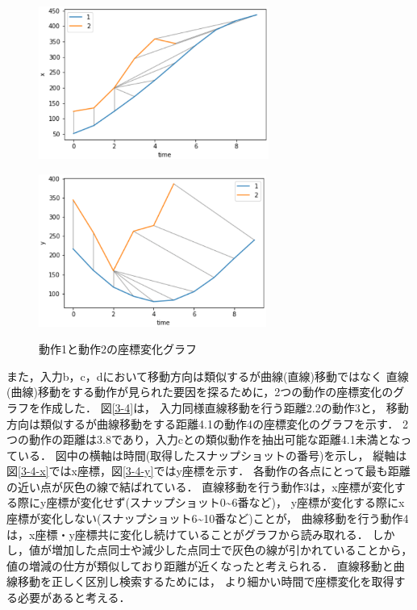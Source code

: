 \documentclass[11pt]{jreport}
\begin{document}
\begin{figure}[H]
    \centering
    \begin{minipage}{0.45\linewidth}
        \centering
        \includegraphics[height=5cm]{1-2-x.eps}
        \label{1-2-x}
    \end{minipage}
    \hspace{0.04\columnwidth}
    \begin{minipage}{0.45\linewidth}
        \centering
        \includegraphics[height=5cm]{1-2-y.eps}
        \label{1-2-y}
    \end{minipage}
    \hspace{0.04\columnwidth}
    \caption{動作1と動作2の座標変化グラフ}
    \label{1-2}
\end{figure}

また，入力b，c，dにおいて移動方向は類似するが曲線(直線)移動ではなく
直線(曲線)移動をする動作が見られた要因を探るために，2つの動作の座標変化のグラフを作成した．
図\ref{3-4}は，
入力同様直線移動を行う距離2.2の動作3と，
移動方向は類似するが曲線移動をする距離4.1の動作4の座標変化のグラフを示す．
2つの動作の距離は3.8であり，入力cとの類似動作を抽出可能な距離4.1未満となっている．
図中の横軸は時間(取得したスナップショットの番号)を示し，
縦軸は図\ref{3-4-x}ではx座標，図\ref{3-4-y}ではy座標を示す．
各動作の各点にとって最も距離の近い点が灰色の線で結ばれている．
直線移動を行う動作3は，x座標が変化する際にy座標が変化せず(スナップショット0\textasciitilde6番など)，
y座標が変化する際にx座標が変化しない(スナップショット6\textasciitilde10番など)ことが，
曲線移動を行う動作4は，x座標・y座標共に変化し続けていることがグラフから読み取れる．
しかし，値が増加した点同士や減少した点同士で灰色の線が引かれていることから，
値の増減の仕方が類似しており距離が近くなったと考えられる．
直線移動と曲線移動を正しく区別し検索するためには，
より細かい時間で座標変化を取得する必要があると考える．
\end{document}
